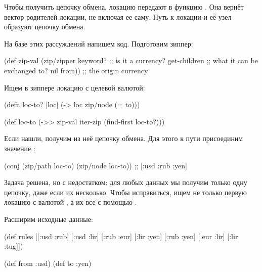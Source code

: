 


Чтобы получить цепочку обмена, локацию  передают в функцию . Она
вернёт вектор родителей локации, не включая ее саму. Путь к локации и её узел
образуют цепочку обмена.

На базе этих рассуждений напишем код. Подготовим зиппер:

\begin{english}
  \begin{clojure}
(def zip-val
  (zip/zipper keyword?      ;; is it a currency?
              get-children  ;; what it can be exchanged to?
              nil
              from))        ;; the origin currency
  \end{clojure}
\end{english}

Ищем в зиппере локацию с целевой валютой:

\begin{english}
  \begin{clojure}
(defn loc-to? [loc]
  (-> loc zip/node (= to)))

(def loc-to
  (->> zip-val
       iter-zip
       (find-first loc-to?)))
  \end{clojure}
\end{english}

Если нашли, получим из неё цепочку обмена. Для этого к пути присоединим значение
:

\begin{english}
  \begin{clojure}
(conj (zip/path loc-to) (zip/node loc-to))
;; [:usd :rub :yen]
  \end{clojure}
\end{english}

Задача решена, но с недостатком: для любых данных мы получим только одну
цепочку, даже если их несколько. Чтобы исправиться, ищем не только первую
локацию с валютой , а их все с помощью .

Расширим исходные данные:

\begin{english}
  \begin{clojure}
(def rules
  [[:usd :rub]
   [:usd :lir]
   [:rub :eur]
   [:lir :yen]
   [:rub :yen]
   [:eur :lir]
   [:lir :tug]])

(def from :usd)
(def to :yen)
  \end{clojure}
\end{english}

